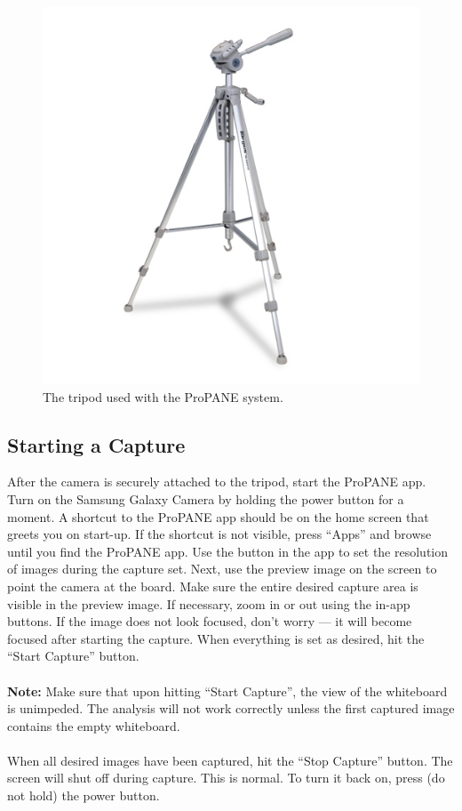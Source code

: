 \documentclass[]{article}
\begin{document}
\begin{figure}[h]
\centering
\includegraphics[scale=0.3]{images/tripod}
\caption{The tripod used with the ProPANE system.}
\end{figure}	
			
		\subsection{Starting a Capture}
			After the camera is securely attached to the tripod, start the ProPANE app.  Turn on the Samsung Galaxy Camera by holding the power button for a moment.  A shortcut to the ProPANE app should be on the home screen that greets you on start-up.  If the shortcut is not visible, press ``Apps'' and browse until you find the ProPANE app.  Use the button in the app to set the resolution of images during the capture set.  Next, use the preview image on the screen to point the camera at the board.  Make sure the entire desired capture area is visible in the preview image.  If necessary, zoom in or out using the in-app buttons.  If the image does not look focused, don't worry --- it will become focused after starting the capture.  When everything is set as desired, hit the ``Start Capture'' button. \\ \\

\textbf{Note:} Make sure that upon hitting ``Start Capture'', the view of the whiteboard is unimpeded.  The analysis will not work correctly unless the first captured image contains the empty whiteboard. \\ \\			
			 When all desired images have been captured, hit the ``Stop Capture'' button.  The screen will shut off during capture.  This is normal.  To turn it back on, press (do not hold) the power button.
			
\end{document}

